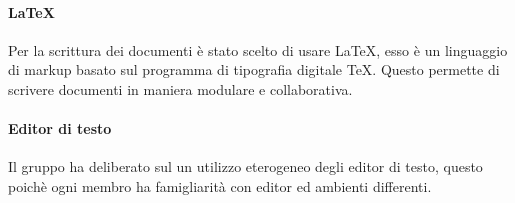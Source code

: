 			\paragraph{LaTeX}
				Per la scrittura dei documenti è stato scelto di usare \LaTeX{}, esso è un linguaggio di markup basato sul programma di tipografia digitale \TeX{}. Questo permette di scrivere documenti in maniera modulare e collaborativa.
			\paragraph{Editor di testo}
				Il gruppo ha deliberato sul un utilizzo eterogeneo degli editor di testo, questo poichè ogni membro ha famigliarità con editor ed ambienti differenti.
